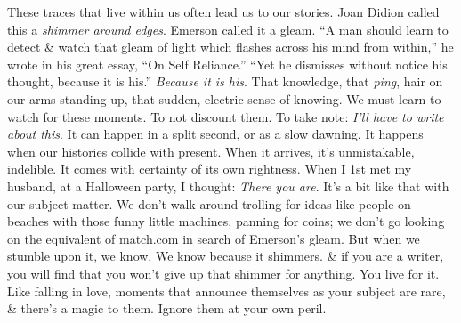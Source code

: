 \documentclass{article}
\begin{document}
\begin{itemize}
	These traces that live within us often lead us to our stories. {\sc Joan Didion} called this a {\it shimmer around edges}. {\sc Emerson} called it a gleam. ``A man should learn to detect \& watch that gleam of light which flashes across his mind from within,'' he wrote in his great essay, ``On Self Reliance.'' ``Yet he dismisses without notice his thought, because it is his.'' {\it Because it is his}. That knowledge, that {\it ping}, hair on our arms standing up, that sudden, electric sense of knowing. We must learn to watch for these moments. To not discount them. To take note: {\it I'll have to write about this}. It can happen in a split second, or as a slow dawning. It happens when our histories collide with present. When it arrives, it's unmistakable, indelible. It comes with certainty of its own rightness. When I 1st met my husband, at a Halloween party, I thought: {\it There you are}. It's a bit like that with our subject matter. We don't walk around trolling for ideas like people on beaches with those funny little machines, panning for coins; we don't go looking on the equivalent of match.com in search of {\sc Emerson}'s gleam. But when we stumble upon it, we know. We know because it shimmers. \& if you are a writer, you will find that you won't give up that shimmer for anything. You live for it. Like falling in love, moments that announce themselves as your subject are rare, \& there's a magic to them. Ignore them at your own peril.
	

\end{itemize}
\end{document}
